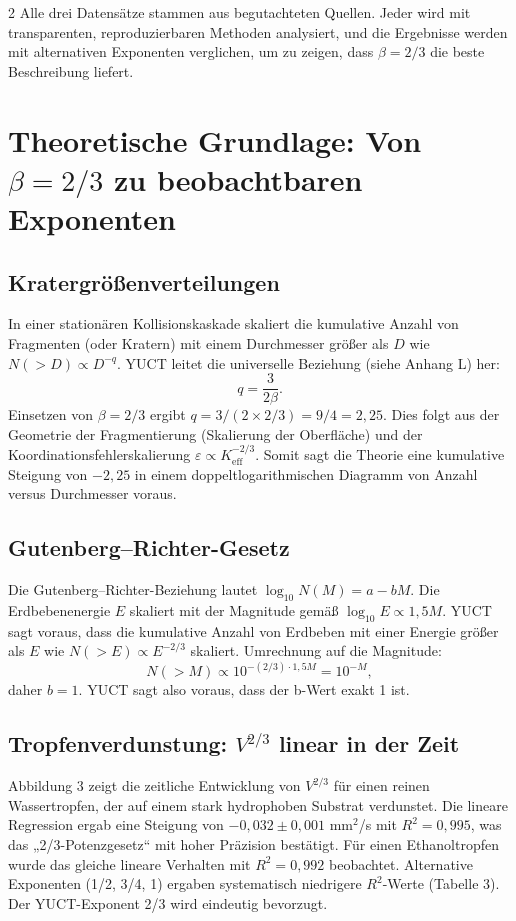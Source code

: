 \documentclass[11pt,a4paper]{article}
\newcommand{\eps}{\varepsilon}
\newcommand{\Keff}{K_{\mathrm{eff}}}
\newcommand{\betaf}{\beta}
\begin{document}
\begin{multicols}{2}
		Alle drei Datensätze stammen aus begutachteten Quellen. Jeder wird mit transparenten, reproduzierbaren Methoden analysiert, und die Ergebnisse werden mit alternativen Exponenten verglichen, um zu zeigen, dass \(\betaf = 2/3\) die beste Beschreibung liefert.
		
		\section{Theoretische Grundlage: Von \(\betaf = 2/3\) zu beobachtbaren Exponenten}
		
		\subsection{Kratergrößenverteilungen}
		
		In einer stationären Kollisionskaskade skaliert die kumulative Anzahl von Fragmenten (oder Kratern) mit einem Durchmesser größer als \(D\) wie \(N(>D) \propto D^{-q}\). YUCT leitet die universelle Beziehung (siehe Anhang L) her:
		\[
		q = \frac{3}{2\betaf}.
		\]
		Einsetzen von \(\betaf = 2/3\) ergibt \(q = 3/(2 \times 2/3) = 9/4 = 2,25\). Dies folgt aus der Geometrie der Fragmentierung (Skalierung der Oberfläche) und der Koordinationsfehlerskalierung \(\eps \propto \Keff^{-2/3}\). Somit sagt die Theorie eine kumulative Steigung von \(-2,25\) in einem doppeltlogarithmischen Diagramm von Anzahl versus Durchmesser voraus.
		
		\subsection{Gutenberg–Richter-Gesetz}
		
		Die Gutenberg–Richter-Beziehung \cite{GutenbergRichter1954} lautet \(\log_{10} N(M) = a - b M\). Die Erdbebenenergie \(E\) skaliert mit der Magnitude gemäß \(\log_{10} E \propto 1,5 M\). YUCT sagt voraus, dass die kumulative Anzahl von Erdbeben mit einer Energie größer als \(E\) wie \(N(>E) \propto E^{-2/3}\) skaliert. Umrechnung auf die Magnitude:
		\[
		N(>M) \propto 10^{-(2/3) \cdot 1,5 M} = 10^{-M},
		\]
		daher \(b = 1\). YUCT sagt also voraus, dass der b-Wert exakt 1 ist.
		
		\subsection{Tropfenverdunstung: \(V^{2/3}\) linear in der Zeit}
		
		Abbildung 3 zeigt die zeitliche Entwicklung von \(V^{2/3}\) für einen reinen Wassertropfen, der auf einem stark hydrophoben Substrat verdunstet. Die lineare Regression ergab eine Steigung von \(-0,032 \pm 0,001\) mm\(^2\)/s mit \(R^2 = 0,995\), was das „2/3-Potenzgesetz“ mit hoher Präzision bestätigt. Für einen Ethanoltropfen wurde das gleiche lineare Verhalten mit \(R^2 = 0,992\) beobachtet. Alternative Exponenten (1/2, 3/4, 1) ergaben systematisch niedrigere \(R^2\)-Werte (Tabelle 3). Der YUCT-Exponent 2/3 wird eindeutig bevorzugt.
		

\end{multicols}
\end{document}
